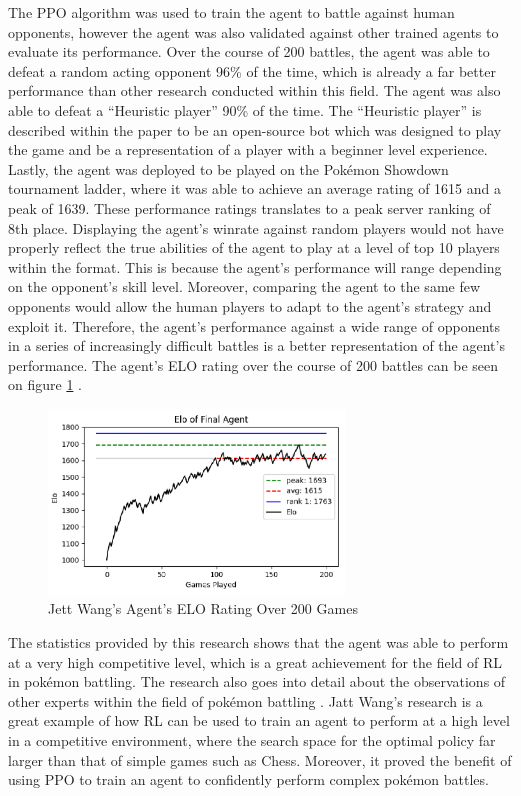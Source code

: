 The PPO algorithm was used to train the agent to battle against human opponents, however the agent was also validated against other trained agents to evaluate its performance. Over the course of 200 battles, the agent was able to defeat a random acting opponent 96\% of the time, which is already a far better performance than other research conducted within this field. The agent was also able to defeat a ``Heuristic player'' 90\% of the time. The ``Heuristic player'' is described within the paper to be an open-source bot which was designed to play the game and be a representation of a player with a beginner level experience. Lastly, the agent was deployed to be played on the Pokémon Showdown tournament ladder, where it was able to achieve an average rating of 1615 and a peak of 1639. These performance ratings translates to a peak server ranking of 8th place. Displaying the agent's winrate against random players would not have properly reflect the true abilities of the agent to play at a level of top 10 players within the format. This is because the agent's performance will range depending on the opponent's skill level. Moreover, comparing the agent to the same few opponents would allow the human players to adapt to the agent's strategy and exploit it. Therefore, the agent's performance against a wide range of opponents in a series of increasingly difficult battles is a better representation of the agent's performance. The agent's ELO rating over the course of 200 battles can be seen on figure \ref{fig:agent_elo} \cite{wang2020winning}.

\begin{figure}[H]
    \centering
    \includegraphics[width=0.7\textwidth]{figures/literature_elo.png}
    \caption{Jett Wang's Agent's ELO Rating Over 200 Games}
    \label{fig:agent_elo}
\end{figure}

The statistics provided by this research shows that the agent was able to perform at a very high competitive level, which is a great achievement for the field of RL in pokémon battling. The research also goes into detail about the observations of other experts within the field of pokémon battling \cite{wang2020winning}. Jatt Wang's research is a great example of how RL can be used to train an agent to perform at a high level in a competitive environment, where the search space for the optimal policy far larger than that of simple games such as Chess. Moreover, it proved the benefit of using PPO to train an agent to confidently perform complex pokémon battles. 

